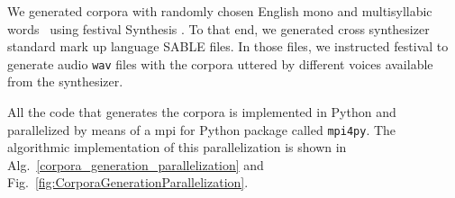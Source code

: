 \documentclass[11pt,a4paper]{article}
\begin{document}



We generated corpora with randomly chosen English mono and multisyllabic words~\cite{Dematties2018} using \gls{festival} Synthesis \cite{festival2014}. To that end, we generated cross synthesizer standard mark up language SABLE \cite{sable} files. In those files, we instructed \gls{festival} to generate audio \texttt{wav} files with the corpora uttered by different voices available from the synthesizer.

All the code that generates the corpora is implemented in Python and parallelized by means of a \gls{mpi} for Python package called \texttt{mpi4py}. The algorithmic implementation of this parallelization is shown in Alg.~\ref{corpora_generation_parallelization} and Fig.~\ref{fig:CorporaGenerationParallelization}.
\end{document}
